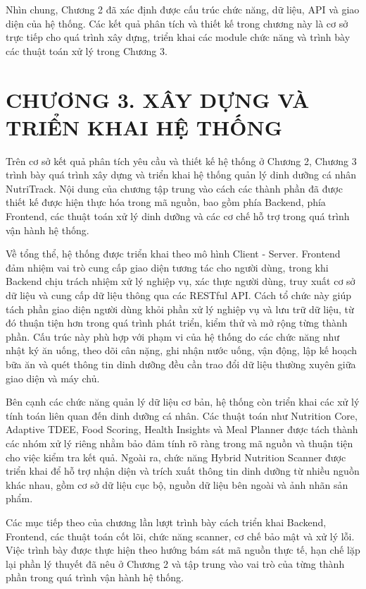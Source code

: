 Nhìn chung, Chương 2 đã xác định được cấu trúc chức năng, dữ liệu, API và giao diện của hệ thống. Các kết quả phân tích và thiết kế trong chương này là cơ sở trực tiếp cho quá trình xây dựng, triển khai các module chức năng và trình bày các thuật toán xử lý trong Chương 3.


\chapter*{CHƯƠNG 3. XÂY DỰNG VÀ TRIỂN KHAI HỆ THỐNG}
Trên cơ sở kết quả phân tích yêu cầu và thiết kế hệ thống ở Chương 2, Chương 3 trình bày quá trình xây dựng và triển khai hệ thống quản lý dinh dưỡng cá nhân NutriTrack. Nội dung của chương tập trung vào cách các thành phần đã được thiết kế được hiện thực hóa trong mã nguồn, bao gồm phía Backend, phía Frontend, các thuật toán xử lý dinh dưỡng và các cơ chế hỗ trợ trong quá trình vận hành hệ thống.

Về tổng thể, hệ thống được triển khai theo mô hình Client - Server. Frontend đảm nhiệm vai trò cung cấp giao diện tương tác cho người dùng, trong khi Backend chịu trách nhiệm xử lý nghiệp vụ, xác thực người dùng, truy xuất cơ sở dữ liệu và cung cấp dữ liệu thông qua các RESTful API. Cách tổ chức này giúp tách phần giao diện người dùng khỏi phần xử lý nghiệp vụ và lưu trữ dữ liệu, từ đó thuận tiện hơn trong quá trình phát triển, kiểm thử và mở rộng từng thành phần. Cấu trúc này phù hợp với phạm vi của hệ thống do các chức năng như nhật ký ăn uống, theo dõi cân nặng, ghi nhận nước uống, vận động, lập kế hoạch bữa ăn và quét thông tin dinh dưỡng đều cần trao đổi dữ liệu thường xuyên giữa giao diện và máy chủ.

Bên cạnh các chức năng quản lý dữ liệu cơ bản, hệ thống còn triển khai các xử lý tính toán liên quan đến dinh dưỡng cá nhân. Các thuật toán như Nutrition Core, Adaptive TDEE, Food Scoring, Health Insights và Meal Planner được tách thành các nhóm xử lý riêng nhằm bảo đảm tính rõ ràng trong mã nguồn và thuận tiện cho việc kiểm tra kết quả. Ngoài ra, chức năng Hybrid Nutrition Scanner được triển khai để hỗ trợ nhận diện và trích xuất thông tin dinh dưỡng từ nhiều nguồn khác nhau, gồm cơ sở dữ liệu cục bộ, nguồn dữ liệu bên ngoài và ảnh nhãn sản phẩm.

Các mục tiếp theo của chương lần lượt trình bày cách triển khai Backend, Frontend, các thuật toán cốt lõi, chức năng scanner, cơ chế bảo mật và xử lý lỗi. Việc trình bày được thực hiện theo hướng bám sát mã nguồn thực tế, hạn chế lặp lại phần lý thuyết đã nêu ở Chương 2 và tập trung vào vai trò của từng thành phần trong quá trình vận hành hệ thống.

